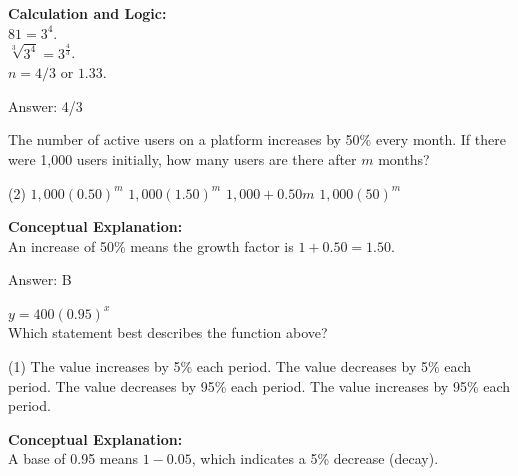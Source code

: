 \documentclass[11pt,paper=a4,answers]{exam}
\begin{document}
\begin{questions}
\begin{solution}
\textbf{Calculation and Logic:} \\
$81 = 3^4$. \\
$\sqrt[3]{3^4} = 3^{\frac{4}{3}}$. \\
$n = 4/3$ or $1.33$.

\vspace{25pt}

Answer: \colorbox{yellow!100}{4/3}
\end{solution}

\vspace{40pt}

\question
The number of active users on a platform increases by 50\% every month. If there were 1,000 users initially, how many users are there after $m$ months?
\begin{tasks}(2)
    \task $1,000(0.50)^m$
    \task $1,000(1.50)^m$
    \task $1,000 + 0.50m$
    \task $1,000(50)^m$
\end{tasks}

\begin{solution}
\textbf{Conceptual Explanation:} \\
An increase of 50\% means the growth factor is $1 + 0.50 = 1.50$.

\vspace{25pt}

Answer: \colorbox{yellow!100}{B}
\end{solution}

\vspace{40pt}

\question
$y = 400(0.95)^x$ \\
Which statement best describes the function above?
\begin{tasks}(1)
    \task The value increases by 5\% each period.
    \task The value decreases by 5\% each period.
    \task The value decreases by 95\% each period.
    \task The value increases by 95\% each period.
\end{tasks}

\begin{solution}
\textbf{Conceptual Explanation:} \\
A base of 0.95 means $1 - 0.05$, which indicates a 5\% decrease (decay).

\vspace{25pt}


\end{solution}
\end{questions}
\end{document}
